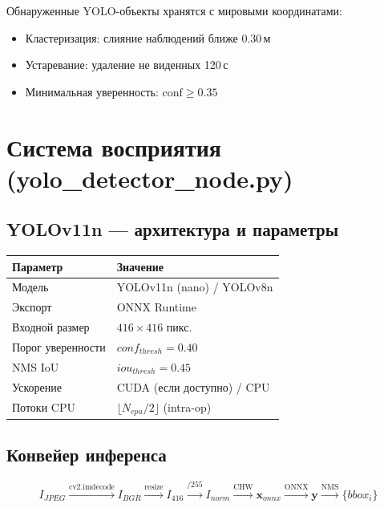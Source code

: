 \documentclass[12pt, a4paper]{article}
\begin{document}
Обнаруженные YOLO-объекты хранятся с мировыми координатами:
\begin{itemize}[noitemsep]
  \item Кластеризация: слияние наблюдений ближе 0.30\,м
  \item Устаревание: удаление не виденных 120\,с
  \item Минимальная уверенность: $\text{conf} \geq 0.35$
\end{itemize}

\newpage
\section{Система восприятия (yolo\_detector\_node.py)}
\label{sec:yolo}

\subsection{YOLOv11n — архитектура и параметры}

\begin{center}
\begin{tabular}{ll}
\toprule
\textbf{Параметр} & \textbf{Значение} \\
\midrule
Модель          & YOLOv11n (nano) / YOLOv8n \\
Экспорт         & ONNX Runtime \\
Входной размер  & $416\times416$ пикс. \\
Порог уверенности & $conf_{thresh} = 0.40$ \\
NMS IoU         & $iou_{thresh} = 0.45$ \\
Ускорение       & CUDA (если доступно) / CPU \\
Потоки CPU      & $\lfloor N_{cpu}/2\rfloor$ (intra-op) \\
\bottomrule
\end{tabular}
\end{center}

\subsection{Конвейер инференса}

\begin{equation}
  I_{JPEG} \xrightarrow{\text{cv2.imdecode}} I_{BGR}
  \xrightarrow{\text{resize}} I_{416}
  \xrightarrow{/255} I_{norm}
  \xrightarrow{\text{CHW}} \mathbf{x}_{onnx}
  \xrightarrow{\text{ONNX}} \mathbf{y}
  \xrightarrow{\text{NMS}} \{bbox_i\}
\end{equation}
\end{document}
